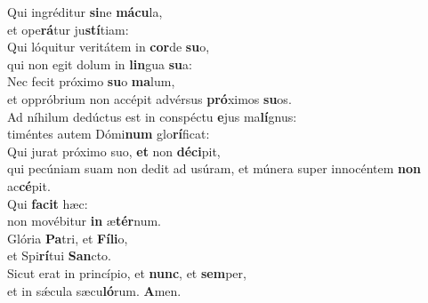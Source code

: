 \evenverse Qui ingréditur \textbf{si}ne \textbf{má}\textbf{cu}la,~\*\\
\evenverse et ope\textbf{rá}tur ju\textbf{stí}tiam:\\
\oddverse Qui lóquitur veritátem in \textbf{cor}de \textbf{su}o,~\*\\
\oddverse qui non egit dolum in \textbf{lin}gua \textbf{su}a:\\
\evenverse Nec fecit próximo \textbf{su}o \textbf{ma}lum,~\*\\
\evenverse et oppróbrium non accépit advérsus \textbf{pró}ximos \textbf{su}os.\\
\oddverse Ad níhilum dedúctus est in conspéctu \textbf{e}jus ma\textbf{lí}gnus:~\*\\
\oddverse timéntes autem Dómi\textbf{num} glo\textbf{rí}ficat:\\
\evenverse Qui jurat próximo suo, \textbf{et} non \textbf{dé}\textbf{ci}pit,~\*\\
\evenverse qui pecúniam suam non dedit ad usúram, et múnera super innocéntem \textbf{non} ac\textbf{cé}pit.\\
\oddverse Qui \textbf{fa}\textbf{cit} hæc:~\*\\
\oddverse non movébitur \textbf{in} æ\textbf{tér}num.\\
\evenverse Glória \textbf{Pa}tri, et \textbf{Fí}\textbf{li}o,~\*\\
\evenverse et Spi\textbf{rí}tui \textbf{San}cto.\\
\oddverse Sicut erat in princípio, et \textbf{nunc}, et \textbf{sem}per,~\*\\
\oddverse et in sǽcula sæcu\textbf{ló}rum. \textbf{A}men.\\
